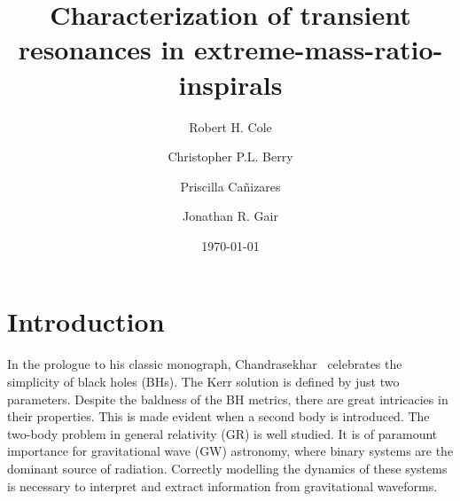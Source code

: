 \documentclass[aps,prd,amsfonts,amssymb,amsmath,nofootinbib,reprint,showpacs]{revtex4-1}
\begin{document}

\title{Characterization of transient resonances in extreme-mass-ratio-inspirals}

\author{Robert H. Cole}
\author{Christopher P.L. Berry}
\author{Priscilla Ca\~{n}izares}
\author{Jonathan R. Gair}

\date{\today}

\begin{abstract}
\end{abstract}


\maketitle

\section{Introduction}

In the prologue to his classic monograph, Chandrasekhar~\cite{Chandrasekhar1992} celebrates the simplicity of black holes (BHs). The Kerr solution is defined by just two parameters. Despite the baldness of the BH metrics, there are great intricacies in their properties. This is made evident when a second body is introduced. The two-body problem in general relativity (GR) is well studied. It is of paramount importance for gravitational wave (GW) astronomy, where binary systems are the dominant source of radiation. Correctly modelling the dynamics of these systems is necessary to interpret and extract information from gravitational waveforms.
\end{document}
